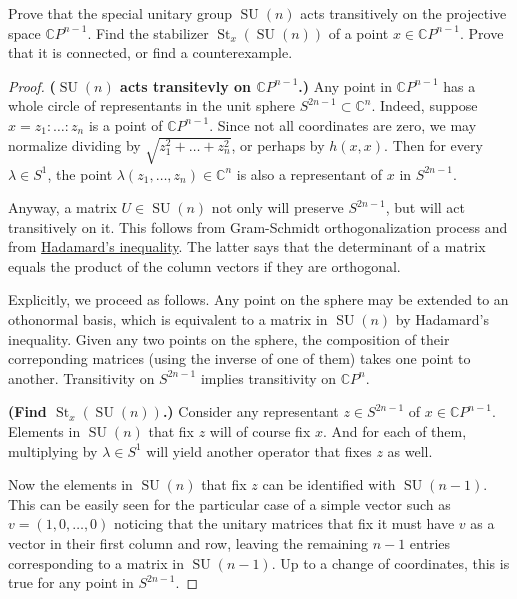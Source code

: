 \documentclass{article}
\newcommand{\C}{\mathbb{C}}
\DeclareMathOperator{\SU}{SU}
\DeclareMathOperator{\St}{St}
\begin{document}
\begin{exercise}\label{ex:3.2}
	Prove that the special unitary group $\SU(n)$ acts transitively on the projective space $\C P^{n-1}$. Find the stabilizer $\St_x(\SU(n))$ of a point $x \in \C P^{n-1}$. Prove that it is connected, or find a counterexample.
\end{exercise}
\begin{proof}\leavevmode

	\textbf{($\SU(n)$ acts transitevly on $\C P^{n-1}$.)} Any point in $\C P^{n-1}$ has a whole circle of representants in the unit sphere $S^{2n-1}\subset \C^n$. Indeed, suppose $x=z_1:\ldots:z_n$ is a point of $\C P^{n-1}$. Since not all coordinates are zero, we may normalize dividing by $\sqrt{z^2_1+\ldots+z^2_n}$, or perhaps by $h(x,x)$. Then for every $\lambda\in S^1$, the point $\lambda(z_1,\ldots,z_n)\in\C^n$ is also a representant of $x$ in $S^{2n-1}$.
	
	Anyway, a matrix $U\in\SU(n)$ not only will preserve $S^{2n-1}$, but will act transitively on it. This follows from Gram-Schmidt orthogonalization process and from \href{https://en.wikipedia.org/wiki/Hadamard%27s_inequality}{Hadamard's inequality}. The latter says that the determinant of a matrix equals the product of the column vectors if they are orthogonal.
	
	Explicitly, we proceed as follows. Any point on the sphere may be extended to an othonormal basis, which is equivalent to a matrix in $\SU(n)$ by Hadamard's inequality. Given any two points on the sphere, the composition of their correponding matrices (using the inverse of one of them) takes one point to another. Transitivity on $S^{2n-1}$ implies transitivity on $\C P^n$.
	
	\textbf{(Find $\St_x(\SU(n))$.)} Consider any representant $z\in S^{2n-1}$ of $x\in\C P^{n-1}$. Elements in $\SU(n)$ that fix $z$ will of course fix $x$. And for each of them, multiplying by $\lambda\in S^{1}$ will yield another operator that fixes $z$ as well.
	
	Now the elements in $\SU(n)$ that fix $z$ can be identified with $\SU(n-1)$. This can be easily seen for the particular case of a simple vector such as $v=(1,0,\ldots,0)$ noticing that the unitary matrices that fix it must have $v$ as a vector in their first column and row, leaving the remaining $n-1$ entries corresponding to a matrix in $\SU(n-1)$. Up to a change of coordinates, this is true for any point in $S^{2n-1}$.
	

\end{proof}
\end{document}
